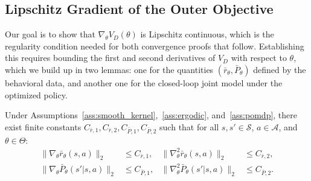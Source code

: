 \documentclass[12pt]{article}
\renewcommand{\[}{\left[}
\renewcommand{\]}{\right]}
\renewcommand{\(}{\left(}
\renewcommand{\)}{\right)}
\newcounter{l1}
\newcounter{l2}
\newcounter{l3}
\begin{document}
\subsection{Lipschitz Gradient of the Outer Objective}
\label{sec:lipschitz}

Our goal is to show that $\nabla_\theta V_D(\theta)$ is Lipschitz continuous, which is
the regularity condition needed for both convergence proofs that follow. Establishing
this requires bounding the first and second derivatives of $V_D$ with respect to
$\theta$, which we build up in two lemmas: one for the quantities
$(\bar{r}_\theta, \bar{P}_\theta)$ defined by the behavioral data, and another one for the
closed-loop joint model under the optimized policy.

\begin{lemma}\label{lem:surrogate_bounds}
Under Assumptions~\ref{ass:smooth_kernel},~\ref{ass:ergodic},
and~\ref{ass:pomdp}, there exist finite constants
$C_{\bar{r},1}, C_{\bar{r},2}, C_{\bar{P},1}, C_{\bar{P},2}$ such that for all
$s, s' \in \mathcal{S}$, $a \in \mathcal{A}$, and $\theta \in \Theta$:
\begin{align*}
  \|\nabla_\theta \bar{r}_\theta(s,a)\|_2 &\le C_{\bar{r},1},
  &\|\nabla^2_\theta \bar{r}_\theta(s,a)\|_2 &\le C_{\bar{r},2},\\
  \|\nabla_\theta \bar{P}_\theta(s'|s,a)\|_2 &\le C_{\bar{P},1},
  &\|\nabla^2_\theta \bar{P}_\theta(s'|s,a)\|_2 &\le C_{\bar{P},2}.
\end{align*}
\end{lemma}
\end{document}
